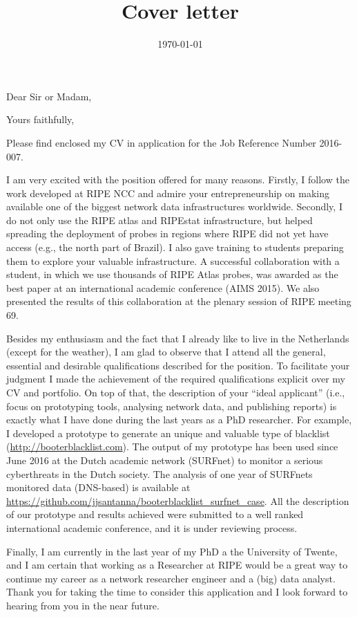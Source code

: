 \documentclass[11pt,a4paper,sans]{moderncv}        %
\title{Cover letter}
\begin{document}
\date{\today}
\opening{Dear Sir or Madam,}
\closing{Yours faithfully,}

\makelettertitle

\justify
Please find enclosed my CV in application for the Job Reference Number 2016-007.

I am very excited with the position offered for many reasons. Firstly, I follow the work developed at RIPE NCC and admire your entrepreneurship on making available one of the biggest network data infrastructures worldwide. Secondly, I do not only use the RIPE atlas and RIPEstat infrastructure, but helped spreading the deployment of probes in regions where RIPE did not yet have access (e.g., the north part of Brazil). I also gave training to students preparing them to explore your valuable infrastructure. A successful collaboration with a student, in which we use thousands of RIPE Atlas probes, was awarded as the best paper at an international academic conference (AIMS 2015). We also presented the results of this collaboration at the plenary session of RIPE meeting 69.

Besides my enthusiasm and the fact that I already like to live in the Netherlands (except for the weather), I am glad to observe that I attend all the general, essential and desirable qualifications described for the position. To facilitate your judgment I made the achievement of the required qualifications explicit over my CV and portfolio. On top of that, the description of your ``ideal applicant'' (i.e., focus on prototyping tools, analysing network data, and publishing reports) is exactly what I have done during the last years as a PhD researcher. For example, I developed a prototype to generate an unique and valuable type of blacklist (\url{http://booterblacklist.com}). The output of my prototype has been used since June 2016 at the Dutch academic network (SURFnet) to monitor a serious cyberthreats in the Dutch society. The analysis of one year of SURFnets monitored data (DNS-based) is available at \url{https://github.com/jjsantanna/booterblacklist_surfnet_case}. All the description of our prototype and results achieved were submitted to a well ranked international academic conference, and it is under reviewing process.

Finally, I am currently in the last year of my PhD a the University of Twente, and I am certain that working as a Researcher at RIPE would be a great way to continue my career as a network researcher engineer and a (big) data analyst. Thank you for taking the time to consider this application and I look forward to hearing from you in the near future.


\makeletterclosing
\end{document}
